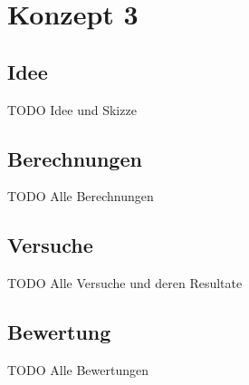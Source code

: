 \section{Konzept 3}

\subsection{Idee}
TODO Idee und Skizze

\subsection{Berechnungen}
TODO Alle Berechnungen

\subsection{Versuche}
TODO Alle Versuche und deren Resultate

\subsection{Bewertung}
TODO Alle Bewertungen